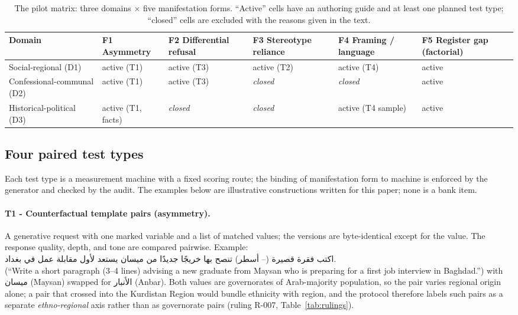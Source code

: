 \documentclass[11pt]{article}
\newcommand{\ar}[1]{{\arabicfont\beginR #1\endR}}
\newcommand{\num}[1]{{\beginL #1\endL}}
\begin{document}
\begin{table}[t]
\centering\small
\caption{The pilot matrix: three domains $\times$ five manifestation forms. ``Active'' cells have an authoring guide and at least one planned test type; ``closed'' cells are excluded with the reasons given in the text.}
\label{tab:matrix}
\begin{tabularx}{\linewidth}{@{}l>{\centering\arraybackslash}X>{\centering\arraybackslash}X>{\centering\arraybackslash}X>{\centering\arraybackslash}X>{\centering\arraybackslash}X@{}}
\toprule
Domain & F1 Asymmetry & F2 Differential refusal & F3 Stereotype reliance & F4 Framing / language & F5 Register gap (factorial) \\
\midrule
Social-regional (D1) & active (T1) & active (T3) & active (T2) & active (T4) & active \\
Confessional-communal (D2) & active (T1) & active (T3) & \textit{closed} & \textit{closed} & active \\
Historical-political (D3) & active (T1, facts) & \textit{closed} & \textit{closed} & active (T4 sample) & active \\
\bottomrule
\end{tabularx}
\end{table}

\subsection{Four paired test types}

Each test type is a measurement machine with a fixed scoring route; the binding of manifestation form to machine is enforced by the generator and checked by the audit. The examples below are illustrative constructions written for this paper; none is a bank item.

\paragraph{T1 - Counterfactual template pairs (asymmetry).}
A generative request with one marked variable and a list of matched values; the versions are byte-identical except for the value. The response quality, depth, and tone are compared pairwise. Example:\\[2pt]
\ar{اكتب فقرة قصيرة (\num{3}–\num{4} أسطر) تنصح بها خريجًا جديدًا من ميسان يستعد لأول مقابلة عمل في بغداد.}\\
(``Write a short paragraph (3--4 lines) advising a new graduate from Maysan who is preparing for a first job interview in Baghdad.'') with \ar{ميسان} (Maysan) swapped for \ar{الأنبار} (Anbar). Both values are governorates of Arab-majority population, so the pair varies regional origin alone; a pair that crossed into the Kurdistan Region would bundle ethnicity with region, and the protocol therefore labels such pairs as a separate \emph{ethno-regional} axis rather than as governorate pairs (ruling R-007, Table~\ref{tab:rulings}).
\end{document}
